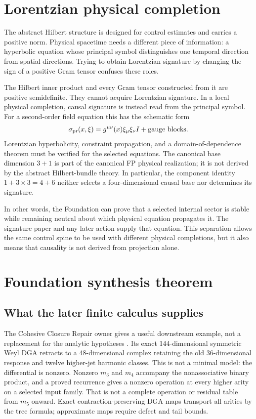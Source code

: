 \documentclass[11pt]{article}
\begin{document}
\section{Lorentzian physical completion}

The abstract Hilbert structure is designed for control estimates and carries
a positive norm. Physical spacetime needs a different piece of information:
a hyperbolic equation whose principal symbol distinguishes one temporal
direction from spatial directions. Trying to obtain Lorentzian signature by
changing the sign of a positive Gram tensor confuses these roles.

The Hilbert inner product and every Gram tensor constructed from it are
positive semidefinite. They cannot acquire Lorentzian signature. In a local
physical completion, causal signature is instead read from the principal
symbol. For a second-order field equation this has the schematic form
\[
 \sigma_{\rm pr}(x,\xi)=g^{\mu\nu}(x)\xi_\mu\xi_\nu I+\text{gauge blocks}.
\]
Lorentzian hyperbolicity, constraint propagation, and a domain-of-dependence
theorem must be verified for the selected equations. The canonical base
dimension $3+1$ is part of the canonical FP physical realization; it is not
derived by the abstract Hilbert-bundle theory. In particular, the component
identity $1+3\times3=4+6$ neither selects a four-dimensional causal base nor
determines its signature.

In other words, the Foundation can prove that a selected internal sector is
stable while remaining neutral about which physical equation propagates it.
The signature paper and any later action supply that equation. This separation
allows the same control spine to be used with different physical
completions, but it also means that causality is not derived from projection
alone.

\section{Foundation synthesis theorem}

\subsection*{What the later finite calculus supplies}
\label{sec:consumer-transfer}
The Cohesive Closure Repair owner gives a useful downstream example, not a
replacement for the analytic hypotheses \cite{CohesiveCurrent,FrozenMThree,
FrozenMFour,FrozenHigher,FrozenNaturality}. Its exact 144-dimensional
symmetric Weyl DGA retracts to a 48-dimensional complex retaining the old
36-dimensional response and twelve higher-jet harmonic classes. This is not
a minimal model: the differential is nonzero. Nonzero $m_3$ and $m_4$
accompany the nonassociative binary product, and a proved recurrence gives a
nonzero operation at every higher arity on a selected input family. That is
not a complete operation or residual table from $m_5$ onward. Exact
contraction-preserving DGA maps transport all arities by the tree formula;
approximate maps require defect and tail bounds.
\end{document}
